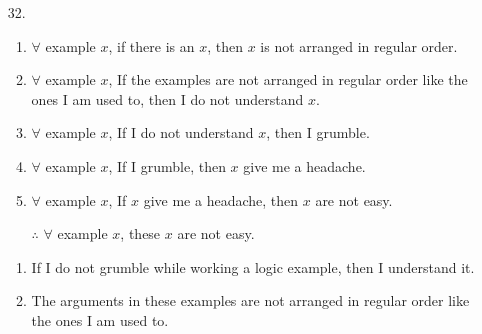 \documentclass[12pt]{article}
\begin{document}
\begin{enumerate}
            \begin{enumerate}
                \item[32.]
                    \begin{enumerate}
                        \item $\forall$ example $x$, if there is an $x$, then $x$ is not arranged in regular order.
                        \item $\forall$ example $x$, If the examples are not arranged in regular order like the ones I am used to, then I do not understand $x$.
                        \item $\forall$ example $x$, If I do not understand $x$, then I grumble.
                        \item $\forall$ example $x$, If I grumble, then $x$ give me a headache.
                        \item $\forall$ example $x$, If $x$ give me a headache, then $x$ are not easy.
                        \item[$\therefore$] $\forall$ example $x$, these $x$ are not easy.
                    \end{enumerate}
                    \begin{enumerate}
                        \item If I do not grumble while working a logic example, then I understand it.
                        \begin{center}
                        \end{center}
                        
                        \item The arguments in these examples are not arranged in regular order like the ones I am used to.
                        \begin{center}
                        \end{center}
                        

\end{enumerate}
\end{enumerate}
\end{enumerate}
\end{document}
